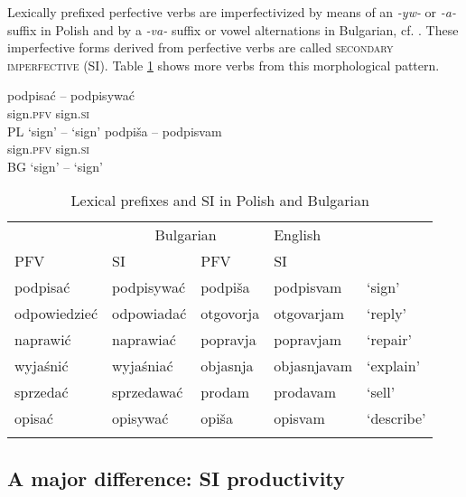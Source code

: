 \documentclass[output=paper,colorlinks,citecolor=brown]{langscibook}
\begin{document}
\noindent Lexically prefixed perfective verbs are imperfectivized by means of an \textit{-yw-} or \textit{-a-} suffix in Polish and by a \textit{-va-} suffix or vowel alternations in Bulgarian, cf. . These imperfective forms derived from perfective verbs are called \textsc{secondary imperfective} (SI). Table \ref{table:lexical:PL+BG} shows more verbs from this morphological pattern. 

\ea \label{basics:lexical}
\ea \gll podpisać -- podpisywać \\
sign.\textsc{pfv} {} sign.\textsc{si}\\\hfill PL
\glt `sign' -- `sign'
\ex  \gll  podpiša -- podpisvam   \\
sign.\textsc{pfv} {} sign.\textsc{si}\\ \hfill BG
\glt `sign' -- `sign'
\z 
\z 



\begin{table}
\begin{tabularx}{\textwidth}{ X X  l l  l }
  \lsptoprule
\multicolumn{2}{c}{Polish}  & \multicolumn{2}{c}{Bulgarian} & {English}\\
  \cmidrule(lr){1-2}\cmidrule(lr){3-4}
%
PFV & SI & PFV & SI & \\ 

\midrule
 podpisać  & podpisywać & podpiša & podpisvam & `sign'\\
odpowiedzieć & odpowiadać & otgovorja & otgovarjam  & `reply’ \\
%
naprawić & naprawiać & popravja & popravjam & `repair' \\ 
%
wyjaśnić & wyjaśniać & objasnja & objasnjavam & `explain' \\ 
%
sprzedać & sprzedawać & prodam & prodavam & `sell'\\ 
%
opisać & opisywać & opiša & opisvam & `describe' \\
%
\lspbottomrule
\end{tabularx}
\caption{Lexical prefixes and SI in Polish and Bulgarian}
\label{table:lexical:PL+BG}
\end{table}

 




\subsection{A major difference: SI productivity} 
\end{document}
